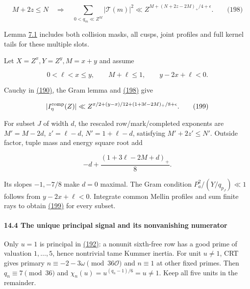 \hypertarget{dr:marked-energy-interface}{}

\label{dr:marked-energy-interface}

\[
M+2z\le N\quad\Longrightarrow\quad
 \sum_{0<q_m\ll Z^M}|\mathcal T(m)|^2
 \ll Z^{M+(N+2z-2M)_+/4+\epsilon}.
 \qquad\text{(198)}
\]

Lemma \protect\hyperlink{mf:marked-energy}{7.1} includes both collision masks, all cusps, joint profiles and full kernel tails for these multiple slots.

Let \(X=Z^x,Y=Z^y,M=x+y\) and assume

\[
0<\ell<x\le y,\qquad M+\ell\le1,\qquad y-2x+\ell<0.
\]

Cauchy in \protect\hyperlink{dr:physical}{(190)}, the Gram lemma and \protect\hyperlink{dr:marked-energy-interface}{(198)} give

\hypertarget{dr:physical-bound}{}

\label{dr:physical-bound}

\[
|I_\eta^{\rm comp}(Z)|
 \ll Z^{x/2+(y-x)/12+(1+3\ell-2M)_+/8+\epsilon}.
 \qquad\text{(199)}
\]

For subset \(J\) of width \(d\), the rescaled row/mark/completed exponents are \(M'=M-2d\), \(z'=\ell-d\), \(N'=1+\ell-d\), satisfying \(M'+2z'\le N'\). Outside factor, tuple mass and energy square root add

\[
-d+\frac{(1+3\ell-2M+d)_+}{8}.
\]

Its slopes \(-1,-7/8\) make \(d=0\) maximal. The Gram condition \(P_a^2/(Y/q_{p_J})\ll1\) follows from \(y-2x+\ell<0\). Integrate common Mellin profiles and sum finite rays to obtain \protect\hyperlink{dr:physical-bound}{(199)} for every subset.

\hypertarget{dr:signal}{}

\label{dr:signal}

\hypertarget{the-unique-principal-signal-and-its-nonvanishing-numerator}{%
\paragraph{14.4 The unique principal signal and its nonvanishing numerator}\label{the-unique-principal-signal-and-its-nonvanishing-numerator}}

Only \(u=1\) is principal in \protect\hyperlink{dr:Poisson}{(192)}: a nonunit sixth-free row has a good prime of valuation \(1,\ldots,5\), hence nontrivial tame Kummer inertia. For unit \(u\ne1\), CRT gives primary \(n\equiv-2-3\omega\pmod{36\mathcal O}\) and \(n\equiv1\) at other fixed primes. Then \(q_n\equiv7\pmod{36}\) and \(\chi_n(u)=u^{(q_n-1)/6}=u\ne1\). Keep all five units in the remainder.

